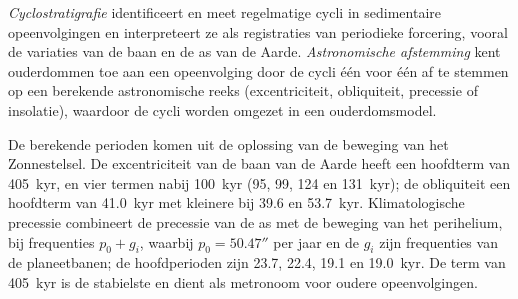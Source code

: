 \begin{definition}\label{def:b3:sequence-stratigraphy:cyclo}
\emph{Cyclostratigrafie} identificeert en meet
regelmatige cycli in sedimentaire opeenvolgingen en interpreteert ze als registraties van
periodieke forcering, vooral de variaties van de baan en de as van de Aarde.
\emph{Astronomische afstemming} kent ouderdommen toe aan een
opeenvolging door de cycli één voor één af te stemmen op een berekende astronomische
reeks (excentriciteit, obliquiteit, precessie of insolatie), waardoor de cycli worden omgezet in een
ouderdomsmodel.
\end{definition}

De berekende perioden komen uit de oplossing van de beweging van het Zonnestelsel.
De excentriciteit van de baan van de Aarde heeft een hoofdterm van \qty{405}{kyr}, en
vier termen nabij \qty{100}{kyr} (95, 99, 124 en \qty{131}{kyr}); de
obliquiteit een hoofdterm van \qty{41.0}{kyr} met kleinere bij 39.6 en
\qty{53.7}{kyr}. Klimatologische precessie combineert de precessie van de as
met de beweging van het perihelium, bij frequenties $p_0 + g_i$, waarbij $p_0 =
50.47''$ per jaar en de $g_i$ zijn frequenties van de planeetbanen; de
hoofdperioden zijn 23.7, 22.4, 19.1 en \qty{19.0}{kyr}. De term van \qty{405}{kyr}
is de stabielste en dient als metronoom voor oudere opeenvolgingen.

